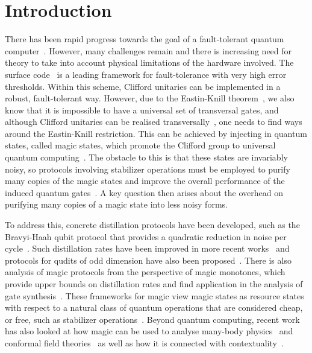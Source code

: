 \documentclass[pra,
aps,
twocolumn,
superscriptaddress,
groupedaddress,
nofootinbib,
reprint
]{revtex4-1}
\begin{document}
\section{Introduction}
\label{sec:intro}

There has been rapid progress towards the goal of a fault-tolerant quantum computer~\cite{campbell_roads_2017, cit:raussendorf, Raussendorf_2013, Nickerson_2014, Nikahd_2017, chao_2018, lin_pieceable_2020, Lin_2020, Bourassa_2021}. However, many challenges remain and there is increasing need for theory to take into account physical limitations of the hardware involved. The surface code~\cite{Bravyi_1998, Freedman_2001, Dennis_2002, Raussendorf_2007} is a leading framework for fault-tolerance with very high error thresholds. Within this scheme, Clifford unitaries can be implemented in a robust, fault-tolerant way. However, due to the Eastin-Knill theorem~\cite{Eastin_2009}, we also know that it is impossible to have a universal set of transversal gates, and although Clifford unitaries can be realised transversally~\cite{Calderbank_1996, Steane_1996}, one needs to find ways around the Eastin-Knill restriction. This can be achieved by injecting in quantum states, called magic states, which promote the Clifford group to universal quantum computing~\cite{cit:bravyi}. The obstacle to this is that these states are invariably noisy, so protocols involving stabilizer operations must be employed to purify many copies of the magic states and improve the overall performance of the induced quantum gates~\cite{cit:bravyi, Jones_2013, Ogorman_2017}. A key question then arises about the overhead on purifying many copies of a magic state into less noisy forms. 

To address this, concrete distillation protocols have been developed, such as the Bravyi-Haah qubit protocol that provides a quadratic reduction in noise per cycle~\cite{Bravyi2012}. Such distillation rates have been improved in more recent works~\cite{Jones_2013, haah2017magic, Hastings2018, Litinski_2019} and protocols for qudits of odd dimension have also been proposed~\cite{CampbellAnwar_2012, Anwar_2012, Dawkins_2015, Krishna2019, cit:prakash}. There is also analysis of magic protocols from the perspective of magic monotones, which provide upper bounds on distillation rates and find application in the analysis of gate synthesis~\cite{Campbell_2017, Howard_2017, Prakash_2018, Seddon_2021}. These frameworks for magic view magic states as resource states with respect to a natural class of quantum operations that are considered cheap, or free, such as stabilizer operations~\cite{Gour_2019, cit:ahmadi, cit:seddon, Wang_2019}. Beyond quantum computing, recent work has also looked at how magic can be used to analyse many-body physics~\cite{Sarkar_2020} and conformal field theories~\cite{White_2021} as well as how it is connected with contextuality~\cite{Vega_2017, cit:howard2, Zurel_2020, okay2021extremal}.
\end{document}
